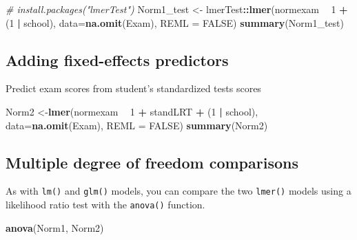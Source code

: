 \documentclass[]{book}
\newenvironment{Shaded}{\begin{snugshade}}{\end{snugshade}}
\newcommand{\KeywordTok}[1]{\textcolor[rgb]{0.13,0.29,0.53}{\textbf{#1}}}
\newcommand{\DataTypeTok}[1]{\textcolor[rgb]{0.13,0.29,0.53}{#1}}
\newcommand{\DecValTok}[1]{\textcolor[rgb]{0.00,0.00,0.81}{#1}}
\newcommand{\StringTok}[1]{\textcolor[rgb]{0.31,0.60,0.02}{#1}}
\newcommand{\CommentTok}[1]{\textcolor[rgb]{0.56,0.35,0.01}{\textit{#1}}}
\newcommand{\OtherTok}[1]{\textcolor[rgb]{0.56,0.35,0.01}{#1}}
\newcommand{\OperatorTok}[1]{\textcolor[rgb]{0.81,0.36,0.00}{\textbf{#1}}}
\newcommand{\NormalTok}[1]{#1}
\begin{document}
\begin{Shaded}
\begin{Highlighting}[]
  \CommentTok{# install.packages("lmerTest")}
\NormalTok{  Norm1_test <-}\StringTok{ }\NormalTok{lmerTest}\OperatorTok{::}\KeywordTok{lmer}\NormalTok{(normexam }\OperatorTok{~}\StringTok{ }\DecValTok{1} \OperatorTok{+}\StringTok{ }\NormalTok{(}\DecValTok{1} \OperatorTok{|}\StringTok{ }\NormalTok{school),}
                      \DataTypeTok{data=}\KeywordTok{na.omit}\NormalTok{(Exam), }\DataTypeTok{REML =} \OtherTok{FALSE}\NormalTok{)}
  \KeywordTok{summary}\NormalTok{(Norm1_test)}
\end{Highlighting}
\end{Shaded}

\subsection{Adding fixed-effects
predictors}\label{adding-fixed-effects-predictors}

Predict exam scores from student's standardized tests scores

\begin{Shaded}
\begin{Highlighting}[]
\NormalTok{  Norm2 <-}\KeywordTok{lmer}\NormalTok{(normexam }\OperatorTok{~}\StringTok{ }\DecValTok{1} \OperatorTok{+}\StringTok{ }\NormalTok{standLRT }\OperatorTok{+}\StringTok{ }\NormalTok{(}\DecValTok{1} \OperatorTok{|}\StringTok{ }\NormalTok{school),}
               \DataTypeTok{data=}\KeywordTok{na.omit}\NormalTok{(Exam), }\DataTypeTok{REML =} \OtherTok{FALSE}\NormalTok{) }
  \KeywordTok{summary}\NormalTok{(Norm2) }
\end{Highlighting}
\end{Shaded}

\subsection{Multiple degree of freedom
comparisons}\label{multiple-degree-of-freedom-comparisons}

As with \texttt{lm()} and \texttt{glm()} models, you can compare the two
\texttt{lmer()} models using a likelihood ratio test with the
\texttt{anova()} function.

\begin{Shaded}
\begin{Highlighting}[]
  \KeywordTok{anova}\NormalTok{(Norm1, Norm2)}
\end{Highlighting}
\end{Shaded}
\end{document}
